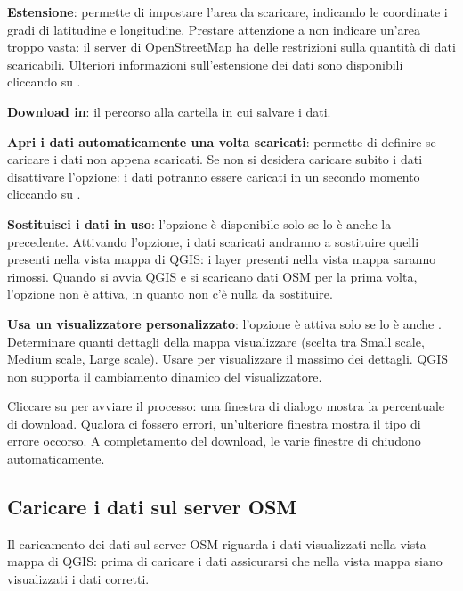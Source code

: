 \begin{description}
\item \textbf{Estensione}: permette di impostare l'area da scaricare, indicando le coordinate i gradi di
latitudine e longitudine. Prestare attenzione a non indicare un'area troppo vasta: il server di 
OpenStreetMap ha delle restrizioni sulla quantità di dati scaricabili. Ulteriori informazioni 
sull'estensione dei dati sono disponibili cliccando su .
\item \textbf{Download in}: il percorso alla cartella in cui salvare i dati. 
\item \textbf{Apri i dati automaticamente una volta scaricati}: permette di definire se caricare i dati non 
appena scaricati. Se non si desidera caricare subito i dati disattivare l'opzione: i dati potranno 
essere caricati in un secondo momento cliccando su .
\item \textbf{Sostituisci i dati in uso}: l'opzione è disponibile solo se lo è anche la precedente. 
Attivando l'opzione, i dati scaricati andranno a sostituire quelli presenti nella vista mappa di QGIS: i 
layer presenti nella vista mappa saranno rimossi. Quando si avvia QGIS e si scaricano dati OSM per la 
prima volta, l'opzione non è attiva, in quanto non c'è nulla da sostituire.
\item \textbf{Usa un visualizzatore personalizzato}: l'opzione è attiva solo se lo è anche 
. Determinare quanti dettagli della mappa 
visualizzare (scelta tra Small scale, Medium scale, Large scale). Usare  per 
visualizzare il massimo dei dettagli. QGIS \CURRENT non supporta il cambiamento dinamico del visualizzatore.
\end{description}

Cliccare su  per avviare il processo: una finestra di dialogo mostra la percentuale 
di download. Qualora ci fossero errori, un'ulteriore finestra mostra il tipo di errore occorso.
A completamento del download, le varie finestre di chiudono automaticamente.

\subsection{Caricare i dati sul server OSM}

Il caricamento dei dati sul server OSM riguarda i dati visualizzati nella vista mappa di QGIS: prima di caricare 
i dati assicurarsi che nella vista mappa siano visualizzati i dati corretti. 


